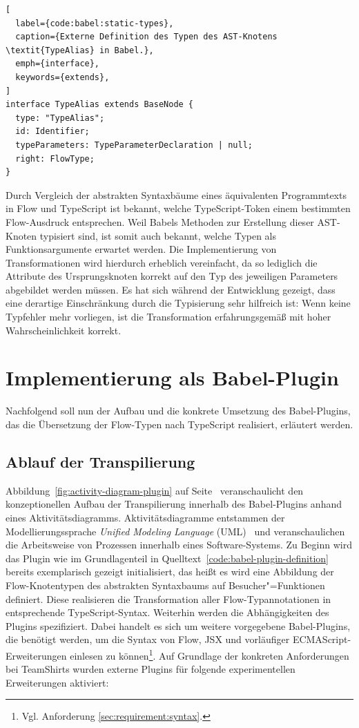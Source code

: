 {\begin{lstlisting}[
  label={code:babel:static-types},
  caption={Externe Definition des Typen des AST-Knotens \textit{TypeAlias} in Babel.},
  emph={interface},
  keywords={extends},
]
interface TypeAlias extends BaseNode {
  type: "TypeAlias";
  id: Identifier;
  typeParameters: TypeParameterDeclaration | null;
  right: FlowType;
}
\end{lstlisting}

Durch Vergleich der abstrakten Syntaxbäume eines äquivalenten Programmtexts in Flow und TypeScript ist bekannt, welche TypeScript-Token einem bestimmten Flow-Ausdruck entsprechen. Weil Babels Methoden zur Erstellung dieser AST-Knoten typisiert sind, ist somit auch bekannt, welche Typen als Funktionsargumente erwartet werden. Die Implementierung von Transformationen wird hierdurch erheblich vereinfacht, da so lediglich die Attribute des Ursprungsknoten korrekt auf den Typ des jeweiligen Parameters abgebildet werden müssen. Es hat sich während der Entwicklung gezeigt, dass eine derartige Einschränkung durch die Typisierung sehr hilfreich ist: Wenn keine Typfehler mehr vorliegen, ist die Transformation erfahrungsgemäß mit hoher Wahrscheinlichkeit korrekt.

\section{Implementierung als Babel-Plugin}

Nachfolgend soll nun der Aufbau und die konkrete Umsetzung des Babel-Plugins, das die Übersetzung der Flow-Typen nach TypeScript realisiert, erläutert werden.

\subsection{Ablauf der Transpilierung}

Abbildung~\ref{fig:activity-diagram-plugin} auf Seite~\pageref{fig:activity-diagram-plugin} veranschaulicht den konzeptionellen Aufbau der Transpilierung innerhalb des Babel-Plugins anhand eines Aktivitätsdiagramms. Aktivitätsdiagramme entstammen der Modellierungssprache \textit{Unified Modeling Language} (UML)~\autocite{OMG:UML} und veranschaulichen die Arbeitsweise von Prozessen innerhalb eines Software-Systems. Zu Beginn wird das Plugin wie im Grundlagenteil in Quelltext~\ref{code:babel-plugin-definition} bereits exemplarisch gezeigt initialisiert, das heißt es wird eine Abbildung der Flow-Knotentypen des abstrakten Syntaxbaums auf Besucher"=Funktionen definiert. Diese realisieren die Transformation aller Flow-Typannotationen in entsprechende TypeScript-Syntax.
Weiterhin werden die Abhängigkeiten des Plugins spezifiziert. Dabei handelt es sich um weitere vorgegebene Babel-Plugins, die benötigt werden, um die Syntax von Flow, JSX und vorläufiger ECMAScript-Erweiterungen einlesen zu können\footnote{Vgl. Anforderung \ref{sec:requirement:syntax}.}. Auf Grundlage der konkreten Anforderungen bei TeamShirts wurden externe Plugins für folgende experimentellen Erweiterungen aktiviert:

}
